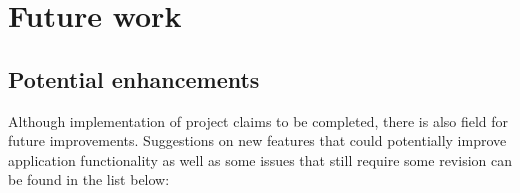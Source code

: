 

%


\section{Future work}

\label{sec:ch8_future_work}

\subsection{Potential enhancements}

Although implementation of project claims to be completed, there is also field for future improvements. Suggestions on new features that could potentially improve application functionality as well as some issues that still require some revision can be found in the list below:

